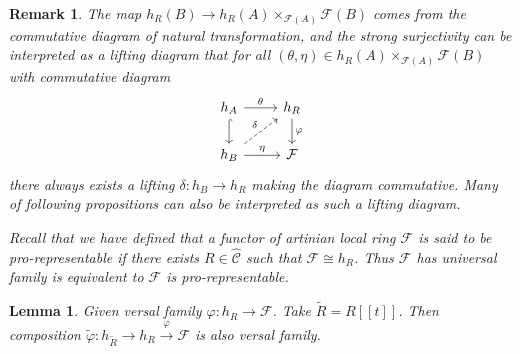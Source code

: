 \documentclass{ctexart}
\newtheorem{remark}{Remark}[section]
\newtheorem{lemma}{Lemma}[section]
\begin{document}
\begin{remark}
    The map $h_{R}(B) \rightarrow h_{R}(A) \times_{\mathcal{F}(A)} \mathcal{F}(B)$ comes from the commutative diagram of natural transformation,
    and the strong surjectivity can be interpreted as a lifting diagram that for all $(\theta, \eta)\in h_{R}(A) \times_{\mathcal{F}(A)} \mathcal{F}(B)$ with commutative diagram
    \begin{equation}
        \begin{tikzcd}
            h_{A} \arrow[r, "\theta"] \arrow[d, hookrightarrow] &
            h_{R} \arrow[d, "\varphi"] \\
            h_{B} \arrow[ur, dashrightarrow, "\delta"] \arrow[r, "\eta"] &
            \mathcal{F}
        \end{tikzcd}
    \end{equation}
    there always exists a lifting $\delta: h_{B} \rightarrow h_{R}$ making the diagram commutative.
    Many of following propositions can also be interpreted as such a lifting diagram.
    \par
    Recall that we have defined that a functor of artinian local ring $\mathcal{F}$ is said to be pro-representable if there exists $R\in \widehat{\mathcal{C}}$ such that $\mathcal{F} \cong h_{R}$.
    Thus $\mathcal{F}$ has universal family is equivalent to $\mathcal{F}$ is pro-representable.
\end{remark}
\begin{lemma}
    Given versal family $\varphi: h_{R} \rightarrow \mathcal{F}$.
    Take $\widetilde{R} = R[[t]]$.
    Then composition $\widetilde{\varphi}: h_{\widetilde{R}} \rightarrow h_{R} \overset{\varphi}{\rightarrow} \mathcal{F}$ is also versal family.
    \label{Lemma 4.2}
\end{lemma}
\end{document}
